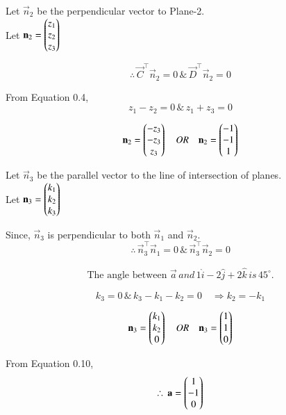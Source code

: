 \documentclass[journal]{IEEEtran}
\begin{document}
Let $\vec{n}_2$ be the perpendicular vector to Plane-2.\\
Let $\mathbf{n}_2 = \begin{pmatrix}z_1 \\ z_2 \\ z_3\end{pmatrix}$

\begin{equation}
\therefore \, \vec{C}^\top\vec{n}_2=0 \, \& \, \vec{D}^\top\vec{n}_2=0
\end{equation}

From Equation 0.4,
\begin{equation}
z_1 - z_2 =0 \, \& \, z_1 + z_3 = 0
\end{equation}

\begin{equation}
    \mathbf{n}_2 = \begin{pmatrix}-z_3 \\ -z_3 \\ z_3\end{pmatrix} \quad OR \quad \mathbf{n}_2 = \begin{pmatrix}-1 \\ -1 \\ 1\end{pmatrix}
\end{equation}


Let $\vec{n}_3$ be the parallel vector to the line of intersection of planes.\\
Let $\mathbf{n}_3 = \begin{pmatrix}k_1 \\ k_2 \\ k_3\end{pmatrix}$

Since, $\vec{n}_3$ is perpendicular to both $\vec{n}_1$ and $\vec{n}_2$.
\begin{equation}
    \therefore \, \vec{n}_3^\top\vec{n}_1=0 \, \& \, \vec{n}_3^\top\vec{n}_2 =0
\end{equation}


\begin{align}
  \boxed{\text{The angle between } \vec{a} \, and \, 1\hat{i} -2\hat{j}+2\hat{k} \, is \, 45^{\circ}.}  
\end{align}
  
\begin{equation}
k_3 = 0 \, \& \, k_3 - k_1 - k_2 = 0 \quad \Rightarrow k_2 = -k_1
\end{equation}

\begin{equation}
\mathbf{n}_3 = \begin{pmatrix}k_1 \\ k_2 \\ 0\end{pmatrix} \quad OR \quad \mathbf{n}_3 = \begin{pmatrix}1 \\ 1 \\ 0\end{pmatrix}    
\end{equation}

From Equation 0.10,
\begin{equation}
\therefore \, \mathbf{a} = \begin{pmatrix}1 \\ -1 \\ 0\end{pmatrix}    
\end{equation}
\end{document}
